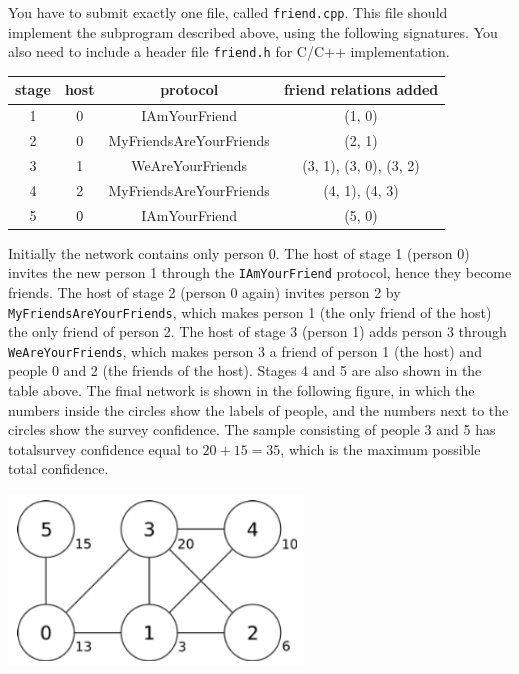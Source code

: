 You have to submit exactly one file, called \texttt{friend.cpp}. This file should implement the subprogram described above, using the following signatures. You also need to include a header file \texttt{friend.h} for C/C++ implementation.

\begin{center}
\renewcommand{\arraystretch}{1.5}
\begin{tabular}{|c|c|c|c|}
\hline
stage & host & protocol & friend relations added\\
\hline
1 &  0 & IAmYourFriend &  (1, 0) \\
\hline
2 & 0 & MyFriendsAreYourFriends & (2, 1) \\
\hline
3 & 1 & WeAreYourFriends & (3, 1), (3, 0), (3, 2)  \\
\hline
4 & 2 & MyFriendsAreYourFriends & (4, 1), (4, 3) \\
\hline
5 & 0 & IAmYourFriend & (5, 0) \\
\hline
\end{tabular}
\end{center}

Initially the network contains only person 0. The host of stage 1 (person 0) invites the new person 1 through the \texttt{IAmYourFriend} protocol, hence they become friends. The host of stage 2 (person 0 again) invites person 2 by \texttt{MyFriendsAreYourFriends}, which makes person 1 (the only friend of the host) the only friend of person 2. The host of stage 3 (person 1) adds person 3 through \texttt{WeAreYourFriends}, which makes person 3 a friend of person 1 (the host) and people 0 and 2 (the friends of the host). Stages 4 and 5 are also shown in the table above. The final network is shown in the following figure, in which the numbers inside the circles show the labels of people, and the numbers next to the circles show the survey confidence. The sample consisting of people 3 and 5 has totalsurvey confidence equal to $20 + 15 = 35$, which is the maximum possible total confidence.

\includegraphics{1.png}